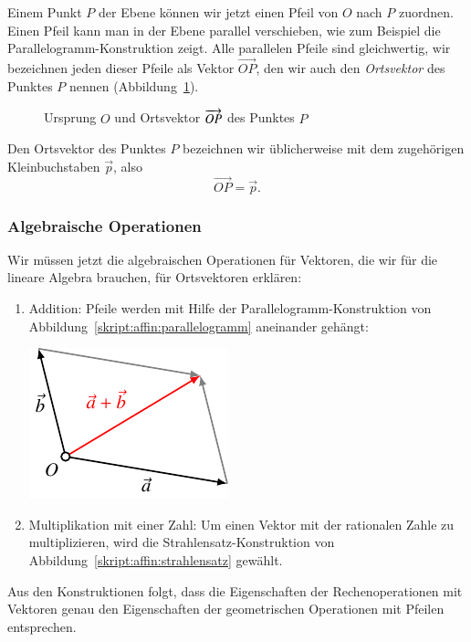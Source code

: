 Einem Punkt $P$ der Ebene können wir jetzt einen Pfeil
von $O$ nach $P$ zuordnen.
Einen Pfeil kann man in der Ebene parallel verschieben,
wie zum Beispiel die Parallelogramm-Konstruktion zeigt.
Alle parallelen Pfeile sind gleichwertig, wir bezeichnen
jeden dieser Pfeile als Vektor $\overrightarrow{OP}$, den
wir auch den {\em Ortsvektor} des Punktes $P$ nennen
(Abbildung~\ref{skript:affin:ortsvektor}).
\begin{figure}
\centering
{}
\caption{
Ursprung $O$ und Ortsvektor $\protect\overrightarrow{OP}$ des Punktes $P$
\label{skript:affin:ortsvektor}
}
\end{figure}

\begin{konvention}
Den Ortsvektor des Punktes $P$ bezeichnen wir üblicherweise mit dem 
zugehörigen Kleinbuchstaben $\vec{p}$, also
\[
\overrightarrow{OP} = \vec{p}.
\]
\end{konvention}

\subsubsection{Algebraische Operationen}
Wir müssen jetzt die algebraischen Operationen für Vektoren,
die wir für die lineare Algebra brauchen, für Ortsvektoren erklären:
\begin{enumerate}
\item
Addition: Pfeile werden mit Hilfe der Parallelogramm-Konstruktion
von Abbildung~\ref{skript:affin:parallelogramm}
aneinander gehängt:
\begin{center}
\includegraphics{3/images/addition.pdf}
\end{center}
\item
Multiplikation mit einer Zahl: Um einen Vektor mit der rationalen
Zahle zu multiplizieren, wird die Strahlensatz-Konstruktion
von Abbildung~\ref{skript:affin:strahlensatz} gewählt.
\end{enumerate}
Aus den Konstruktionen folgt, dass die Eigenschaften der Rechenoperationen
mit Vektoren genau den Eigenschaften der geometrischen Operationen
mit Pfeilen entsprechen.

